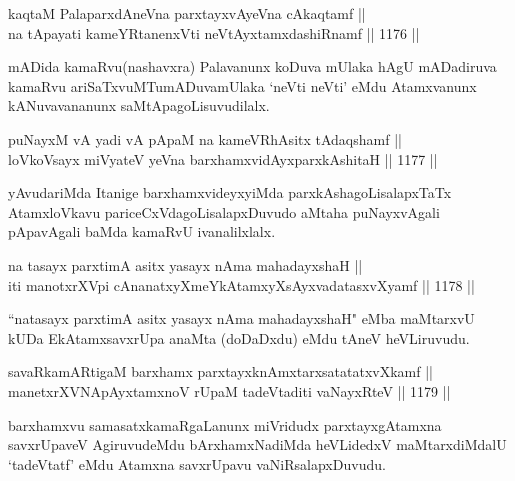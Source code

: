 
\begin{shl}
kaqtaM PalaparxdAneVna parxtayxvAyeVna cAkaqtamf ||  \\
na tApayati kameYRtanenxVti neVtAyxtamxdashiRnamf \hfill || 1176 ||  
\end{shl}

\begin{artha}
mADida kamaRvu(nashavxra) Palavanunx koDuva mUlaka hAgU mADadiruva kamaRvu ariSaTxvuMTumADuvamUlaka `neVti neVti' eMdu Atamxvanunx kANuvavananunx saMtApagoLisuvudilalx.
\end{artha}


\begin{shl}
puNayxM vA yadi vA pApaM na kameVRhAsitx tAdaqshamf ||  \\
loVkoV\s sayx miVyateV yeVna barxhamxvidAyxparxkAshitaH \hfill || 1177 ||  
\end{shl}

\begin{artha}
yAvudariMda Itanige barxhamxvideyxyiMda parxkAshagoLisalapxTaTx AtamxloVkavu pariceCxVdagoLisalapxDuvudo aMtaha puNayxvAgali pApavAgali baMda kamaRvU ivanalilxlalx.
\end{artha}


\begin{shl}
na tasayx parxtimA asitx yasayx nAma mahadayxshaH || \\
iti manotxrXV\s pi cA\s \s nanatxyXmeYkAtamxyXsAyxvadatasxvXyamf \hfill || 1178 ||  
\end{shl}

\begin{artha}
``natasayx parxtimA asitx yasayx nAma mahadayxshaH" eMba maMtarxvU kUDa EkAtamxsavxrUpa anaMta (doDaDxdu) eMdu tAneV heVLiruvudu.
\end{artha}

\begin{shl}
savaRkamARtigaM barxhamx parxtayxknAmxtarxsatatatxvXkamf || \\
manetxrXVNApAyxtamxnoV rUpaM tadeVtaditi vaNayxRteV \hfill || 1179 ||  
\end{shl}

\begin{artha}
barxhamxvu samasatxkamaRgaLanunx miVridudx parxtayxgAtamxna savxrUpaveV AgiruvudeMdu bArxhamxNadiMda heVLidedxV maMtarxdiMdalU `tadeVtatf' eMdu Atamxna savxrUpavu vaNiRsalapxDuvudu.
\end{artha}

